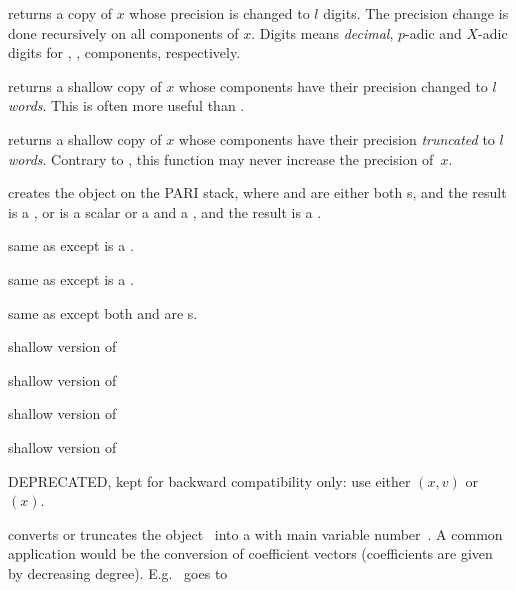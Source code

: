  returns a copy of $x$ whose precision is
changed to $l$ digits. The precision change is done recursively on all
components of $x$. Digits means \emph{decimal}, $p$-adic and $X$-adic digits
for , ,  components, respectively.

 returns a shallow copy of $x$ whose
 components have their precision changed to $l$ \emph{words}. This
is often more useful than .

 returns a shallow copy of $x$ whose
 components have their precision \emph{truncated} to $l$
\emph{words}. Contrary to , this function may never increase
the precision of~$x$.


 creates the object  on
the PARI stack, where  and  are either both s, and the
result is a , or  is a scalar or a  and  a
, and the result is a .

 same as  except  is a
.

 same as  except  is a
.

 same as  except both
 and  are s.

 shallow version of 

 shallow version of 

 shallow version of 

 shallow version of 

 DEPRECATED, kept for backward
compatibility only: use either $(x,v)$ or $(x)$.


 converts or truncates the object~
into a  with main variable number~. A common application
would be the conversion of coefficient vectors (coefficients are given by
decreasing degree). E.g.~\kbd{[2,3]} goes to 

